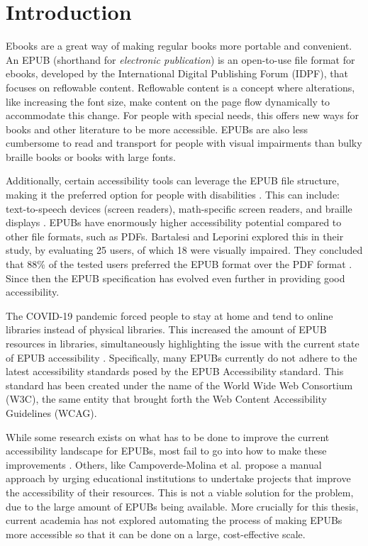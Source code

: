 \section{Introduction}
\label{sec:introduction}
Ebooks are a great way of making regular books more portable and convenient. An EPUB (shorthand for \textit{electronic publication}) is an open-to-use file format for ebooks, developed by the International Digital Publishing Forum (IDPF), that focuses on reflowable content. Reflowable content is a concept where alterations, like increasing the font size, make content on the page flow dynamically to accommodate this change. For people with special needs, this offers new ways for books and other literature to be more accessible. EPUBs are also less cumbersome to read and transport for people with visual impairments than bulky braille books or books with large fonts. 

Additionally, certain accessibility tools can leverage the EPUB file structure, making it the preferred option for people with disabilities \cite{Kasdorf2018}. This can include: text-to-speech devices (screen readers), math-specific screen readers, and braille displays \cite{Giusti2016, Kasdorf2018, Kim2019}.
EPUBs have enormously higher accessibility potential compared to other file formats, such as PDFs. Bartalesi and Leporini explored this in their study, by evaluating 25 users, of which 18 were visually impaired. They concluded that 88\% of the tested users preferred the EPUB format over the PDF format \cite{Bartalesi2015}. Since then the EPUB specification has evolved even further in providing good accessibility.

The COVID-19 pandemic forced people to stay at home and tend to online libraries instead of physical libraries. This increased the amount of EPUB resources in libraries, simultaneously highlighting the issue with the current state of EPUB accessibility \cite{Chee2022}. Specifically, many EPUBs currently do not adhere to the latest accessibility standards posed by the EPUB Accessibility standard. This standard has been created under the name of the World Wide Web Consortium (W3C), the same entity that brought forth the Web Content Accessibility Guidelines (WCAG). 

While some research exists on what has to be done to improve the current accessibility landscape for EPUBs, most fail to go into how to make these improvements \cite{Chee2022}. Others, like Campoverde-Molina et al. \cite{Campoverde2020} propose a manual approach by urging educational institutions to undertake projects that improve the accessibility of their resources. This is not a viable solution for the problem, due to the large amount of EPUBs being available. More crucially for this thesis, current academia has not explored automating the process of making EPUBs more accessible so that it can be done on a large, cost-effective scale.

